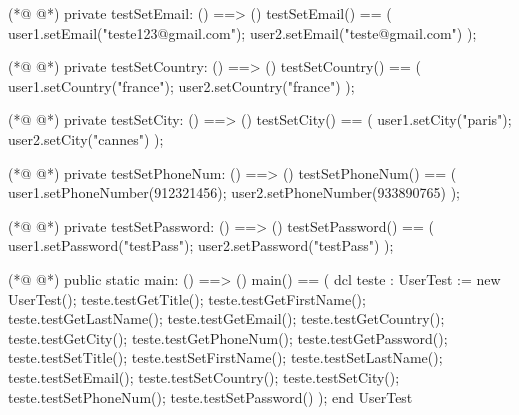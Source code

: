 \begin{vdmpp}[breaklines=true]
(*@
\label{testSetEmail:212}
@*)
 private testSetEmail: () ==> ()
  testSetEmail() ==
  (
   user1.setEmail("teste123@gmail.com");
   user2.setEmail("teste@gmail.com")
  );
  
(*@
\label{testSetCountry:219}
@*)
 private testSetCountry: () ==> ()
  testSetCountry() ==
  (
   user1.setCountry("france");
   user2.setCountry("france")
  );
  
(*@
\label{testSetCity:226}
@*)
 private testSetCity: () ==> ()
  testSetCity() ==
  (
   user1.setCity("paris");
   user2.setCity("cannes")
  );
  
(*@
\label{testSetPhoneNum:233}
@*)
 private testSetPhoneNum: () ==> ()
  testSetPhoneNum() ==
  (
   user1.setPhoneNumber(912321456);
   user2.setPhoneNumber(933890765)
  );
  
(*@
\label{testSetPassword:240}
@*)
 private testSetPassword: () ==> ()
  testSetPassword() ==
  (
   user1.setPassword("testPass");
   user2.setPassword("testPass")
  );
  
(*@
\label{main:247}
@*)
 public static main: () ==> ()
  main() ==
  (
   dcl teste : UserTest := new UserTest();
   teste.testGetTitle();
   teste.testGetFirstName();
   teste.testGetLastName();
   teste.testGetEmail();
   teste.testGetCountry();
   teste.testGetCity();
   teste.testGetPhoneNum();
   teste.testGetPassword();
   teste.testSetTitle();
   teste.testSetFirstName();
   teste.testSetLastName();
   teste.testSetEmail();
   teste.testSetCountry();
   teste.testSetCity();
   teste.testSetPhoneNum();
   teste.testSetPassword()
  );
end UserTest
\end{vdmpp}
\bigskip
